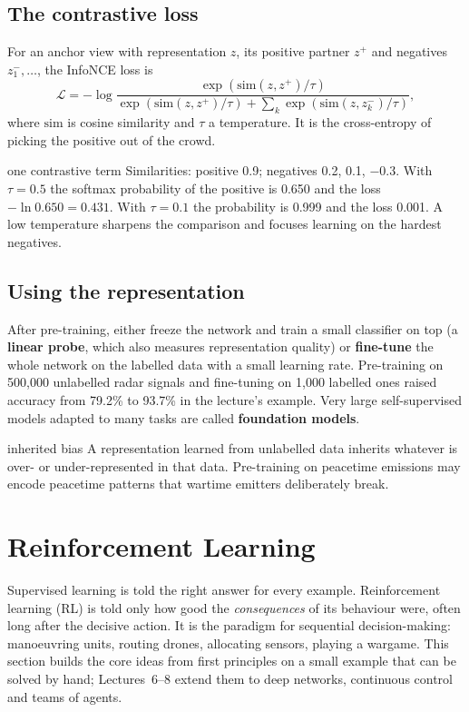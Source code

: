 \documentclass[11pt]{article}
\begin{document}
\subsection{The contrastive loss}
For an anchor view with representation $z$, its positive partner $z^+$ and negatives $z_1^-,\ldots$, the InfoNCE loss is
\[\mathcal L=-\log\frac{\exp(\mathrm{sim}(z,z^+)/\tau)}{\exp(\mathrm{sim}(z,z^+)/\tau)+\sum_k\exp(\mathrm{sim}(z,z_k^-)/\tau)},\]
where $\mathrm{sim}$ is cosine similarity and $\tau$ a temperature. It is the cross-entropy of picking the positive out of the crowd.
\begin{example}{one contrastive term}
Similarities: positive 0.9; negatives 0.2, 0.1, $-0.3$. With $\tau=0.5$ the softmax probability of the positive is 0.650 and the loss $-\ln0.650=0.431$. With $\tau=0.1$ the probability is 0.999 and the loss 0.001. A low temperature sharpens the comparison and focuses learning on the hardest negatives.
\end{example}
\subsection{Using the representation}
After pre-training, either freeze the network and train a small classifier on top (a \textbf{linear probe}, which also measures representation quality) or \textbf{fine-tune} the whole network on the labelled data with a small learning rate. Pre-training on 500,000 unlabelled radar signals and fine-tuning on 1,000 labelled ones raised accuracy from 79.2\% to 93.7\% in the lecture's example. Very large self-supervised models adapted to many tasks are called \textbf{foundation models}.
\begin{pitfall}{inherited bias}
A representation learned from unlabelled data inherits whatever is over- or under-represented in that data. Pre-training on peacetime emissions may encode peacetime patterns that wartime emitters deliberately break.
\end{pitfall}

\section{Reinforcement Learning}
\label{sec:rl}
Supervised learning is told the right answer for every example. Reinforcement learning (RL) is told only how good the \emph{consequences} of its behaviour were, often long after the decisive action. It is the paradigm for sequential decision-making: manoeuvring units, routing drones, allocating sensors, playing a wargame. This section builds the core ideas from first principles on a small example that can be solved by hand; Lectures~6--8 extend them to deep networks, continuous control and teams of agents.
\end{document}
